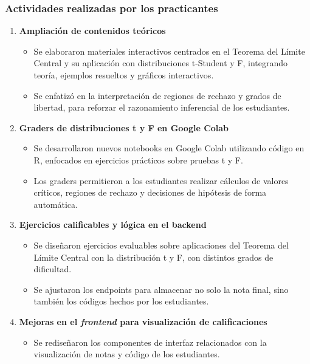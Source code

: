 \documentclass[letter,oneside,12pt,spanish]{report}
\begin{document}
\subsubsection*{Actividades realizadas por los practicantes}

\begin{enumerate}
	\item \textbf{Ampliación de contenidos teóricos}  
	\begin{itemize}
		\item Se elaboraron materiales interactivos centrados en el Teorema del Límite Central y su aplicación con distribuciones t-Student y F, integrando teoría, ejemplos resueltos y gráficos interactivos.
		\item Se enfatizó en la interpretación de regiones de rechazo y grados de libertad, para reforzar el razonamiento inferencial de los estudiantes.
	\end{itemize}
	
	\item \textbf{Graders de distribuciones t y F en Google Colab}  
	\begin{itemize}
		\item Se desarrollaron nuevos notebooks en Google Colab utilizando código en R, enfocados en ejercicios prácticos sobre pruebas t y F.
		\item Los graders permitieron a los estudiantes realizar cálculos de valores críticos, regiones de rechazo y decisiones de hipótesis de forma automática.
	\end{itemize}
	
	\item \textbf{Ejercicios calificables y lógica en el backend}  
	\begin{itemize}
		\item Se diseñaron ejercicios evaluables sobre aplicaciones del Teorema del Límite Central con la distribución t y F, con distintos grados de dificultad.
		\item Se ajustaron los endpoints para almacenar no solo la nota final, sino también los códigos hechos por los estudiantes.
	\end{itemize}
	
	\item \textbf{Mejoras en el \textit{frontend} para visualización de calificaciones}  
	\begin{itemize}
		\item Se rediseñaron los componentes de interfaz relacionados con la visualización de notas y código de los estudiantes.
	\end{itemize}
\end{enumerate}
\end{document}
